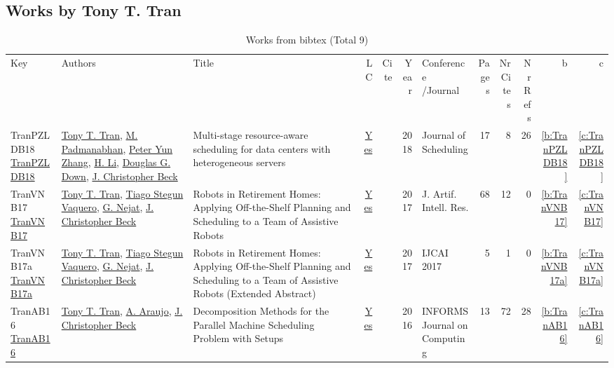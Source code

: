 \subsection{Works by Tony T. Tran}
\label{sec:a811}
{\scriptsize
\begin{longtable}{>{\raggedright\arraybackslash}p{3cm}>{\raggedright\arraybackslash}p{6cm}>{\raggedright\arraybackslash}p{6.5cm}rrrp{2.5cm}rrrrr}
\rowcolor{white}\caption{Works from bibtex (Total 9)}\\ \toprule
\rowcolor{white}Key & Authors & Title & LC & Cite & Year & \shortstack{Conference\\/Journal} & Pages & \shortstack{Nr\\Cites} & \shortstack{Nr\\Refs} & b & c \\ \midrule\endhead
\bottomrule
\endfoot
TranPZLDB18 \href{https://doi.org/10.1007/s10951-017-0537-x}{TranPZLDB18} & \hyperref[auth:a811]{Tony T. Tran}, \hyperref[auth:a812]{M. Padmanabhan}, \hyperref[auth:a813]{Peter Yun Zhang}, \hyperref[auth:a814]{H. Li}, \hyperref[auth:a815]{Douglas G. Down}, \hyperref[auth:a89]{J. Christopher Beck} & Multi-stage resource-aware scheduling for data centers with heterogeneous servers & \href{works/TranPZLDB18.pdf}{Yes} & \cite{TranPZLDB18} & 2018 & Journal of Scheduling & 17 & 8 & 26 & \ref{b:TranPZLDB18} & \ref{c:TranPZLDB18}\\
TranVNB17 \href{https://doi.org/10.1613/jair.5306}{TranVNB17} & \hyperref[auth:a811]{Tony T. Tran}, \hyperref[auth:a816]{Tiago Stegun Vaquero}, \hyperref[auth:a210]{G. Nejat}, \hyperref[auth:a89]{J. Christopher Beck} & Robots in Retirement Homes: Applying Off-the-Shelf Planning and Scheduling to a Team of Assistive Robots & \href{works/TranVNB17.pdf}{Yes} & \cite{TranVNB17} & 2017 & J. Artif. Intell. Res. & 68 & 12 & 0 & \ref{b:TranVNB17} & \ref{c:TranVNB17}\\
TranVNB17a \href{https://doi.org/10.24963/ijcai.2017/726}{TranVNB17a} & \hyperref[auth:a811]{Tony T. Tran}, \hyperref[auth:a816]{Tiago Stegun Vaquero}, \hyperref[auth:a210]{G. Nejat}, \hyperref[auth:a89]{J. Christopher Beck} & Robots in Retirement Homes: Applying Off-the-Shelf Planning and Scheduling to a Team of Assistive Robots (Extended Abstract) & \href{works/TranVNB17a.pdf}{Yes} & \cite{TranVNB17a} & 2017 & IJCAI 2017 & 5 & 1 & 0 & \ref{b:TranVNB17a} & \ref{c:TranVNB17a}\\
TranAB16 \href{https://doi.org/10.1287/ijoc.2015.0666}{TranAB16} & \hyperref[auth:a811]{Tony T. Tran}, \hyperref[auth:a819]{A. Araujo}, \hyperref[auth:a89]{J. Christopher Beck} & Decomposition Methods for the Parallel Machine Scheduling Problem with Setups & \href{works/TranAB16.pdf}{Yes} & \cite{TranAB16} & 2016 & INFORMS Journal on Computing & 13 & 72 & 28 & \ref{b:TranAB16} & \ref{c:TranAB16}\\

\end{longtable}}
